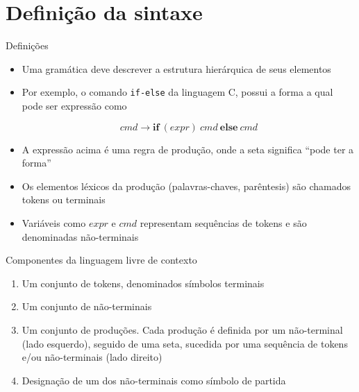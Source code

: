 \section{Definição da sintaxe}

\begin{frame}[fragile]{Definições}

    \begin{itemize}
        \item Uma gramática deve descrever a estrutura hierárquica de seus elementos
        \pause

        \item Por exemplo, o comando \texttt{if-else} da linguagem C, possui a forma
        a qual pode ser expressão como
        \begin{footnotesize}
        \[
            cmd \to \mathbf{if}\ (expr)\ cmd\ \mathbf{else}\ cmd
        \] 
        \end{footnotesize} \pause
        \item A expressão acima é uma regra de produção, onde a seta significa ``pode ter a forma''
        \pause

        \item Os elementos léxicos da produção (palavras-chaves, parêntesis) são chamados tokens ou terminais
        \pause

        \item Variáveis como $expr$ e  $cmd$ representam sequências de tokens e são denominadas não-terminais
    \end{itemize}

\end{frame}

\begin{frame}[fragile]{Componentes da linguagem livre de contexto}

    \begin{enumerate}
        \item Um conjunto de tokens, denominados símbolos terminais
        \pause

        \item Um conjunto de não-terminais
        \pause

        \item Um conjunto de produções. Cada produção é definida por um não-terminal (lado esquerdo), seguido de uma seta, sucedida por uma sequência de tokens
            e/ou não-terminais (lado direito)
        \pause

        \item Designação de um dos não-terminais como símbolo de partida
    \end{enumerate}

\end{frame}

